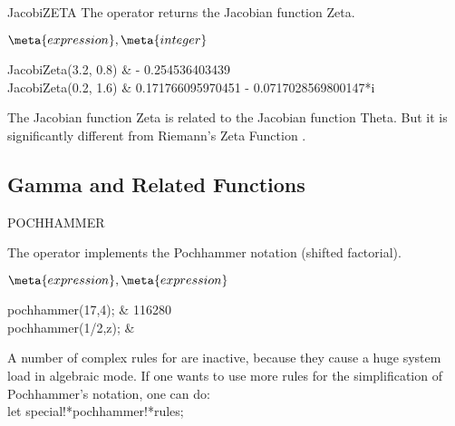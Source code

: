 \begin{Operator}{JacobiZETA}
The  operator returns the Jacobian function Zeta.

\begin{Syntax}
\(\meta{expression},\meta{integer}\)
\end{Syntax}

\begin{Examples}
JacobiZeta(3.2, 0.8)    &  - 0.254536403439 \\
JacobiZeta(0.2, 1.6)    &  0.171766095970451 - 0.0717028569800147*i  \\
\end{Examples}

\begin{Comments}
The Jacobian function Zeta is related to the Jacobian function Theta.
But it is significantly different from Riemann's Zeta Function .
\end{Comments}
\end{Operator}

\subsection{Gamma and Related Functions}
\begin{Operator}{POCHHAMMER}

The  operator implements the Pochhammer notation 
(shifted factorial).

\begin{Syntax}
\(\meta{expression},\meta{expression}\)
\end{Syntax}

\begin{Examples}
pochhammer(17,4);               &   116280 \\

pochhammer(1/2,z);              & 
\end{Examples}

\begin{Comments}
A number of complex rules for  are inactive, because they
cause a huge system load in algebraic mode. If one wants to use more rules
for the simplification of Pochhammer's notation, one can do: 
\\
let special!*pochhammer!*rules;

\end{Comments}
\end{Operator}

